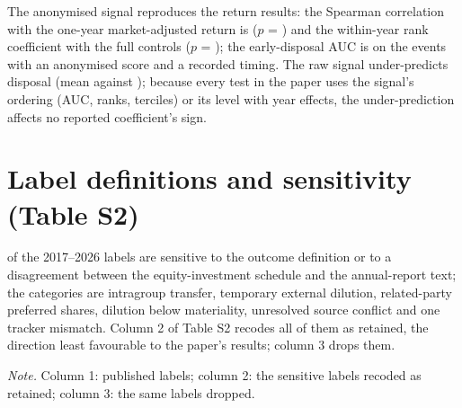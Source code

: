 \documentclass[12pt]{article}
\newcommand{\tabnote}[1]{\par\vspace{4pt}\begin{minipage}{\linewidth}\singlespacing\small\emph{Note.} #1\end{minipage}}
\begin{document}
The anonymised signal reproduces the return results: the Spearman correlation with the one-year market-adjusted return is \SpearmanAnon{} ($p$ = \SpearmanAnonP{}) and the within-year rank coefficient with the full controls \RankAnonCoef{} ($p$ = \RankAnonP{}); the early-disposal AUC is \AUCEarlyAnon{} on the \NAUCEarlyAnon{} events with an anonymised score and a recorded timing. The raw signal under-predicts disposal (mean \ValMeanS{} against \ValMeanY{}); because every test in the paper uses the signal's ordering (AUC, ranks, terciles) or its level with year effects, the under-prediction affects no reported coefficient's sign.

\section{Label definitions and sensitivity (Table S2)}
\NSensitive{} of the 2017--2026 labels are sensitive to the outcome definition or to a disagreement between the equity-investment schedule and the annual-report text; the categories are intragroup transfer, temporary external dilution, related-party preferred shares, dilution below materiality, unresolved source conflict and one tracker mismatch. Column 2 of Table S2 recodes all of them as retained, the direction least favourable to the paper's results; column 3 drops them.
\begin{table}[htbp]\centering\caption{Headline results with definition-sensitive labels flipped or dropped}\label{tab:s_labels}
{\footnotesize\setlength{\tabcolsep}{3pt}}\tabnote{Column 1: published labels; column 2: the \NSensitive{} sensitive labels recoded as retained; column 3: the same labels dropped.}\end{table}
\end{document}
